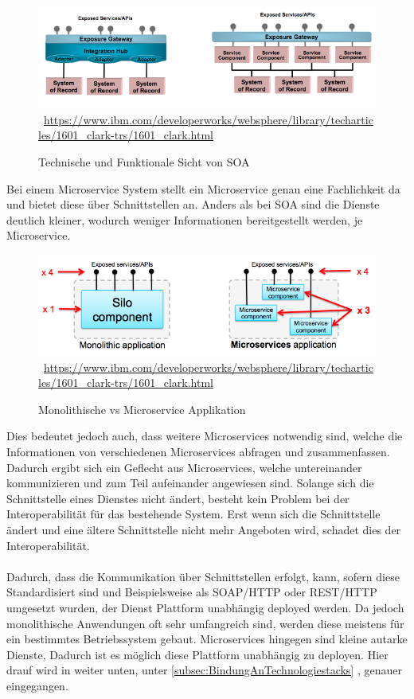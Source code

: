 \begin{figure}[htb]
    \centering 
    \includegraphics[width=\linewidth]{content/images/figure2}\
    \quelle\url{https://www.ibm.com/developerworks/websphere/library/techarticles/1601_clark-trs/1601_clark.html}
    \caption{Technische und Funktionale Sicht von SOA}
    \label{fig:TechnicalAndFunctionalViewsOfSOA} 
\end{figure}

Bei einem Microservice System stellt ein Microservice genau eine Fachlichkeit da und bietet diese über Schnittstellen an. Anders als bei SOA sind die Dienste deutlich kleiner, wodurch weniger Informationen bereitgestellt werden, je Microservice.
\begin{figure}[htb]
    \centering 
    \includegraphics[width=\linewidth]{content/images/MonolithicVsMicroservice}\
    \quelle\url{https://www.ibm.com/developerworks/websphere/library/techarticles/1601_clark-trs/1601_clark.html}
    \caption{Monolithische vs Microservice Applikation}
    \label{fig:MonolithicVsMicroservice} 
\end{figure}
\newpage
Dies bedeutet jedoch auch, dass weitere Microservices notwendig sind, welche die Informationen von verschiedenen Microservices abfragen und zusammenfassen. Dadurch ergibt sich ein Geflecht aus Microservices, welche untereinander kommunizieren und zum Teil aufeinander angewiesen sind. Solange sich die Schnittstelle eines Dienstes nicht ändert, besteht kein Problem bei der Interoperabilität für das bestehende System. Erst wenn sich die Schnittstelle ändert und eine ältere Schnittstelle nicht mehr Angeboten wird, schadet dies der Interoperabilität.
\\\\
Dadurch, dass die Kommunikation über Schnittstellen erfolgt, kann, sofern diese Standardisiert sind und Beispielsweise als SOAP/HTTP oder REST/HTTP umgesetzt wurden, der Dienst Plattform unabhängig deployed werden. Da jedoch monolithische Anwendungen oft sehr umfangreich sind, werden diese meistens für ein bestimmtes Betriebssystem gebaut. Microservices hingegen sind kleine autarke Dienste, Dadurch ist es möglich diese Plattform unabhängig zu deployen. Hier drauf wird in weiter unten, unter \ref{subsec:BindungAnTechnologiestacks} , genauer eingegangen.

